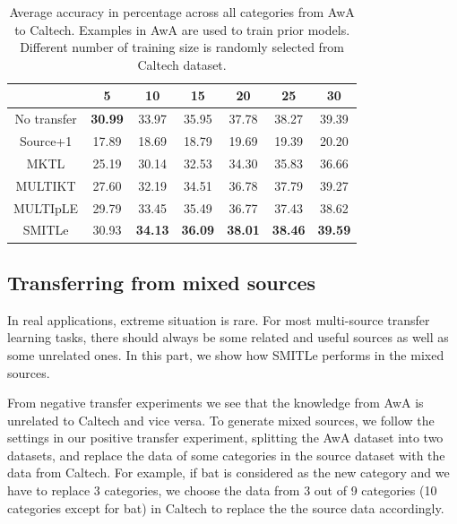 \begin{table}[htbp]
  \centering
  \caption{Average accuracy in percentage across all categories from AwA to Caltech. Examples in AwA are used to train prior models. Different number of training size is randomly selected from Caltech dataset.}
    \begin{tabular}{ccccccc}
    \toprule
                & 5              & 10             & 15             & 20             & 25             & 30 \\
    \midrule
    No transfer &         \textbf{30.99 } &         33.97  &         35.95 &         37.78  &         38.27  &         39.39  \\
    Source+1    &         17.89  &         18.69  &         18.79  &         19.69  &         19.39  &         20.20  \\
    MKTL        &         25.19  &         30.14  &         32.53  &         34.30  &         35.83  &         36.66  \\
    MULTIKT     &         27.60  &         32.19  &         34.51  &         36.78  &         37.79  &         39.27  \\
    MULTIpLE    &         29.79  &         33.45  &         35.49  &         36.77  &         37.43  &         38.62  \\
    SMITLe        &       30.93  &         \textbf{34.13 } &         \textbf{36.09 } &         \textbf{38.01} &         \textbf{38.46} &         \textbf{39.59} \\
    \bottomrule
    \end{tabular}%
  \label{tab:A2C}%
\end{table}%

\subsection{Transferring from mixed sources}
In real applications, extreme situation is rare. For most multi-source transfer learning tasks, there should always be some related and useful sources as well as some unrelated ones. In this part, we show how SMITLe performs in the mixed sources.

From negative transfer experiments we see that the knowledge from AwA is unrelated to Caltech and vice versa. To generate mixed sources, we follow the settings in our positive transfer experiment, splitting the AwA dataset into two datasets, and replace the data of some categories in the source dataset with the data from Caltech. 
For example, if bat is considered as the new category and we have to replace 3 categories, we choose the data from 3 out of 9 categories (10 categories except for bat) in Caltech to replace the the source data accordingly. 


